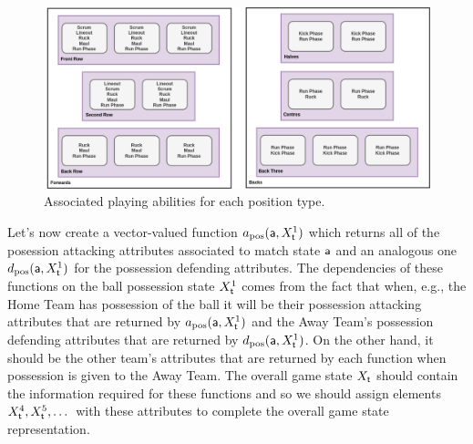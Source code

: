\begin{figure}[h]
\includegraphics[width=15cm]{images/rugby-player-abilities.drawio.png}
\caption{Associated playing abilities for each position type.}
\label{fig:player-abilities}
\end{figure}

Let's now create a vector-valued function $a_{\rm pos}({\sf a}, X^1_{\sf t})$ which returns all of the posession attacking attributes associated to match state ${\sf a}$ and an analogous one $d_{\rm pos}({\sf a}, X^1_{\sf t})$ for the possession defending attributes. The dependencies of these functions on the ball possession state $X^1_{\sf t}$ comes from the fact that when, e.g., the {\sf Home Team} has possession of the ball it will be their possession attacking attributes that are returned by $a_{\rm pos}({\sf a}, X^1_{\sf t})$ and the {\sf Away Team}'s possession defending attributes that are returned by $d_{\rm pos}({\sf a}, X^1_{\sf t})$. On the other hand, it should be the other team's attributes that are returned by each function when possession is given to the {\sf Away Team}. The overall game state $X_{{\sf t}}$ should contain the information required for these functions and so we should assign elements $X^4_{{\sf t}}, X^5_{{\sf t}}, \dots$ with these attributes to complete the overall game state representation.

